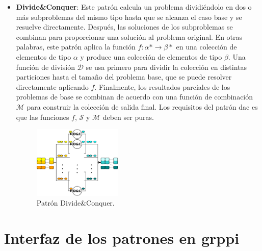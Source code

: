 \begin{itemize}
    \item \textbf{Divide\&Conquer}: Este patrón calcula un problema dividiéndolo en dos o más subproblemas del mismo tipo hasta que se alcanza el caso base y se resuelve directamente. Después, las soluciones de los subproblemas se combinan para proporcionar una solución al problema original. En otras palabras, este patrón aplica la función $f : \alpha * \rightarrow \beta * $ en una colección de elementos de tipo $\alpha$ y produce una colección de elementos de tipo $\beta$. Una función de división $\mathcal{D}$ se usa primero para dividir la colección en distintas particiones hasta el tamaño del problema base, que se puede resolver directamente aplicando $f$. Finalmente, los resultados parciales de los problemas de base se combinan de acuerdo con una función de combinación $\mathcal{M}$ para construir la colección de salida final. Los requisitos del patrón dac es que las funciones $f$, $\mathcal{S}$ y $\mathcal{M}$ deben ser puras. 
    
    \vspace{0.35cm}
    \begin{figure}[htb]
    \centering
    \includegraphics[width=0.40\textwidth]{figures/divideandconquer.pdf}
    \caption{Patrón Divide\&Conquer.}
    \label{fig:chap3:divideandconquer}
    \end{figure}
    \vspace{0.35cm}
    
\end{itemize}

\section{Interfaz de los patrones en \acrshort{grppi}}
\label{sec:interfaz_patrones_grppi}

